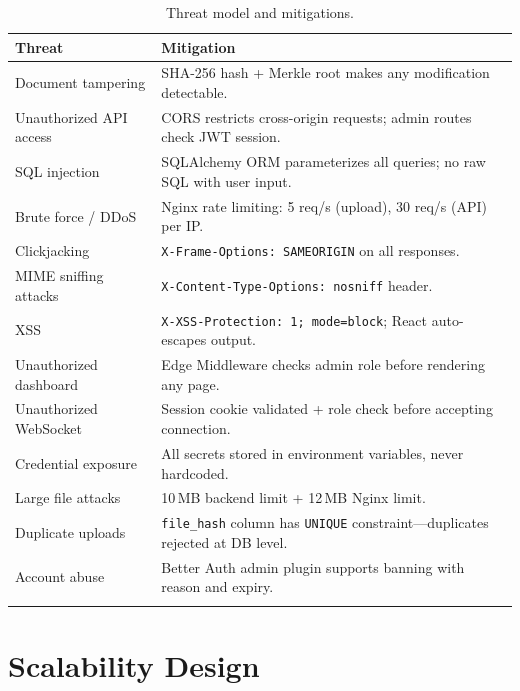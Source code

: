 \documentclass[12pt, a4paper]{report}
\begin{document}
\begin{longtable}{p{4cm} p{10cm}}
\toprule
\textbf{Threat} & \textbf{Mitigation} \\
\midrule
\endhead
Document tampering & SHA-256 hash + Merkle root makes any modification
    detectable. \\
\midrule
Unauthorized API access & CORS restricts cross-origin requests; admin routes
    check JWT session. \\
\midrule
SQL injection & SQLAlchemy ORM parameterizes all queries; no raw SQL with user
    input. \\
\midrule
Brute force / DDoS & Nginx rate limiting: 5 req/s (upload), 30 req/s (API)
    per IP. \\
\midrule
Clickjacking & \texttt{X-Frame-Options: SAMEORIGIN} on all responses. \\
\midrule
MIME sniffing attacks & \texttt{X-Content-Type-Options: nosniff} header. \\
\midrule
XSS & \texttt{X-XSS-Protection: 1; mode=block}; React auto-escapes output. \\
\midrule
Unauthorized dashboard & Edge Middleware checks admin role before rendering any page. \\
\midrule
Unauthorized WebSocket & Session cookie validated + role check before accepting
    connection.  \\
\midrule
Credential exposure & All secrets stored in environment variables, never
    hardcoded. \\
\midrule
Large file attacks & 10\,MB backend limit + 12\,MB Nginx limit. \\
\midrule
Duplicate uploads & \texttt{file\_hash} column has \texttt{UNIQUE}
    constraint—duplicates rejected at DB level. \\
\midrule
Account abuse & Better Auth admin plugin supports banning with reason and expiry. \\
\bottomrule
\caption{Threat model and mitigations.}
\end{longtable}


\chapter{Scalability Design}
\end{document}
